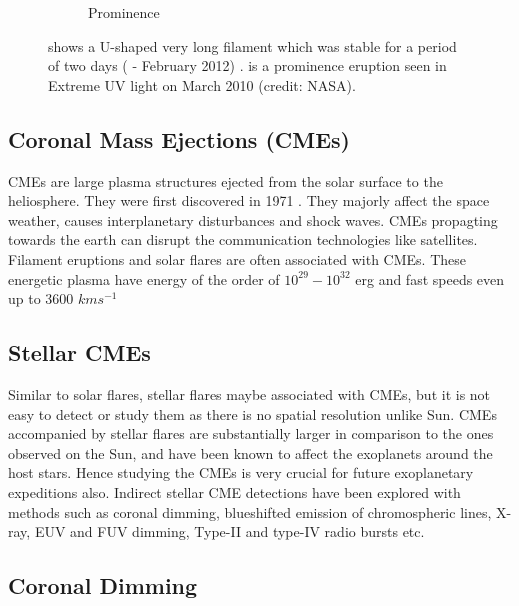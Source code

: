 \begin{figure}
\begin{subfigure}[b]{0.5\textwidth}
         \caption{Prominence}
         \label{fig:prominence}
     \end{subfigure}
     \label{fig:filament_prominence}
     \caption{ shows a U-shaped very long filament which was stable for a period of two days ( -  February 2012) .  is a prominence eruption seen in Extreme UV light on  March 2010 (credit: NASA).}
\end{figure}

\subsection{Coronal Mass Ejections (CMEs)}

CMEs are large plasma structures ejected from the solar surface to the heliosphere. They were first discovered in 1971 \citep{Gopalswamy2016-nm}. They majorly affect the space weather, causes interplanetary disturbances and shock waves. CMEs propagting towards the earth can disrupt the communication technologies like satellites. Filament eruptions and solar flares are often associated with CMEs. These energetic plasma have energy of the order of $10^{29} - 10^{32}$ erg and fast speeds even up to 3600 $kms^{-1}$

\subsection{Stellar CMEs}

Similar to solar flares, stellar flares maybe associated with CMEs, but it is not easy to detect or study them as there is no spatial resolution unlike Sun. CMEs accompanied by stellar flares are substantially larger in comparison to the ones observed on the Sun, and have been known to affect the exoplanets around the host stars. Hence studying the CMEs is very crucial for future exoplanetary expeditions also. Indirect stellar CME detections have been explored with methods such as coronal dimming, blueshifted emission of chromospheric lines, X-ray, EUV and FUV dimming, Type-II and type-IV radio bursts etc.

\subsection{Coronal Dimming}

